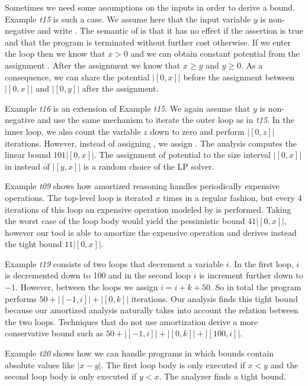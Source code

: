 \documentclass{sigplanconf}
\newcommand{\iffull}[2]{\ifx\fullversion\undefined{#2}\else{#1}\fi}
\begin{document}
{Sometimes we need some assumptions on the inputs in order to derive a
bound.  Example \emph{t15} is such a case.  We assume here that the
input variable $y$ is non-negative and write .  The
semantic of  is that it has no effect if the assertion is
true and that the program is terminated without further cost
otherwise.  If we enter the loop then we know that $x>0$ and we can
obtain constant potential from the assignment .  After the
assignment we know that $x\geq y$ and $y\geq 0$.  As a consequence, we
can share the potential $|[0,x]|$ before the assignment 
between $|[0,x]|$ and $|[0,y]|$ after the assignment.  \iffull{In this way, we
derive a tight linear bound.}{}

Example \emph{t16} is an extension of Example \emph{t15}. We again
assume that $y$ is non-negative and use the same mechanism to iterate
the outer loop as in \emph{t15}.  In the inner loop, we also count the
variable $z$ down to zero and perform $|[0,z]|$ iterations.  However,
instead of assigning , we assign .  The analysis
computes the linear bound $101|[0,x]|$.  The
assignment of potential to the size interval $|[0,x]|$ in instead of
$|[y,x]|$ is a random choice of the LP solver.

Example \emph{t09} shows how amortized reasoning handles periodically
expensive operations.  The top-level loop is iterated $x$ times in
a regular fashion, but every 4 iterations of this loop an expensive
operation modeled by  is performed.  Taking the worst
case of the loop body would yield the pessimistic bound $41|[0,x]|$,
however our tool is able to amortize the expensive operation and derives
instead the tight bound $11|[0,x]|$.

Example \emph{t19} consists of two loops that decrement a variable
$i$.  In the first loop, $i$ is decremented down to 100 and in the
second loop $i$ is increment further down to $-1$.  However, between
the loops we assign $i=i+k+50$.  So in total the program performs $50
+ |[-1,i]| + |[0,k]|$ iterations.  Our analysis finds this tight bound
because our amortized analysis naturally takes into account the
relation between the two loops.  Techniques that do not use
amortization derive a more conservative bound such as $50 + |[-1,i]| +
|[0,k]| + |[100,i]|$.

Example \emph{t20} shows how we can handle programs in which bounds
contain absolute values like $|x-y|$.  The first loop body is only
executed if $x<y$ and the second loop body is only executed if $y<x$.
The analyzer finds a tight bound.

}
\end{document}
